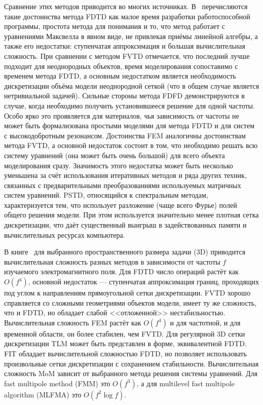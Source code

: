 Сравнение этих методов приводится во многих источниках.
В~\cite{Inan-FDTD-2011} перечисляются такие достоинства метода FDTD
как малое время разработки работоспособной программы, простота метода
для понимания и то, что метод работает с уравнениями Максвелла в явном
виде, не привлекая приёмы линейной алгебры, а также его недостатки:
ступенчатая аппроксимация и большая вычислительная сложность.  При
сравнении с методом FVTD отмечается, что последний лучше подходит для
неоднородных объектов, время моделирования сопоставимо с временем
метода FDTD, а основным недостатком является необходимость
дискретизации объёма модели неоднородной сеткой (что в общем случае
является нетривиальной задачей).  Сильные стороны метода FDFD
демонстрируются в случае, когда необходимо получить установившееся
решение для одной частоты.  Особо ярко это проявляется для материалов,
чья зависимость от частоты не может быть формализована простыми
моделями для метода FDTD и для систем с высокодобротным резонансом.
Достоинства FEM аналогичны достоинствам метода FVTD, а основной
недостаток состоит в том, что необходимо решать всю систему уравнений
(она может быть очень большой) для всего объекта моделирования
сразу. Значимость этого недостатка может быть несколько уменьшена за
счёт использования итеративных методов и ряда других техник, связанных
с предварительными преобразованиями используемых матричных систем
уравнений.  PSTD, относящийся к спектральным методам, характеризуется
тем, что использует разложение (чаще всего Фурье) полей общего решения
модели.  При этом используется значительно менее плотная сетка
дискретизации, что даёт существенный выигрыш в задействованных памяти
и вычислительных ресурсах компьютера.

В книге~\cite{Bondenson-CEM-2005} для выбранного пространственного
размера задачи (3D) приводится вычислительная сложность разных методов
в зависимости от частоты $f$ изучаемого электромагнитного поля.  Для
FDTD число операций растёт как $O(f^4)$, основной недостаток ---
ступенчатая аппроксимация границ, проходящих под углом к направлениям
прямоугольной сетки дискретизации.  FVTD хорошо справляется со
сложными геометриями объектов модели, имеет ту же сложность, что и
FDTD, но обладает слабой <<отложенной>> нестабильностью.
Вычислительная сложность FEM растёт как $O(f^4)$ и для частотной, и
для временной области, он более стабилен, чем FVTD.  Для регулярной 3D
сетки дискретизации TLM может быть представлен в форме, эквивалентной
FDTD.  FIT обладает вычислительной сложностью FDTD, но позволяет
использовать произвольные сетки дискретизации с сохранением
стабильности.  Вычислительная сложность MoM зависит от выбранного
метода решения системы уравнений.  Для fast multipole method (FMM) это
$O(f^3)$, а для multilevel fast multipole algorithm (MLFMA) это
$O(f^2\log f)$.

